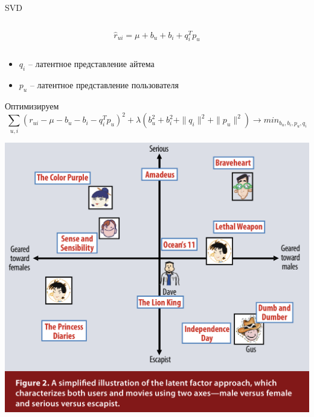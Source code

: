 \documentclass[11pt,aspectratio=169]{beamer}
\begin{document}
\begin{frame}{SVD}

\begin{columns}
\begin{column}{0.2\textwidth} 
\end{column}
\begin{column}{0.5\textwidth} 
\begin{tcolorbox}[colback=info!5,colframe=info!80,title=Модель]
\[
\hat r_{ui} = \mu + b_u + b_i + q_i^T p_u
\]
\end{tcolorbox}
\end{column}
\begin{column}{0.2\textwidth} 
\end{column}
\end{columns}

\vfill

\begin{itemize}
\item $q_i$ -- латентное представление айтема
\item $p_u$ -- латентное представление пользователя
\end{itemize}

\vfill

Оптимизируем
\[
\sum_{u, i} (r_{ui} - \mu - b_u - b_i - q_i^T p_u)^2 + \lambda (b_u^2 +  b_i^2 + \| q_i \|^2 + \| p_u \|^2) \rightarrow min_{b_u, b_i, p_u, q_i}
\]

\end{frame}

\begin{frame}
\begin{center}
\includegraphics[scale=0.3]{images/latent.png}
\end{center}
\end{frame}
\end{document}
